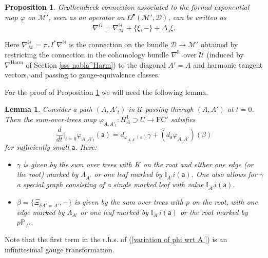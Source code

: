 \documentclass[11pt,a4paper]{amsart}
\theoremstyle{plain} %
\newtheorem{lem}[thm]{Lemma}
\newtheorem{prop}[thm]{Proposition}
\theoremstyle{definition}
\theoremstyle{remark}
\newcommand{\mr}{\mathrm}
\newcommand{\sfa}{\mathsf{a}}
\newcommand{\bt}{\bullet}
\newcommand{\ra}{\rightarrow}
\newcommand{\M}{\mathcal{M}}
\newcommand{\mc}{\mathcal}
\newcommand{\FC}{\mathrm{FC}}
\begin{document}
{\begin{prop}\label{prop formula for nabla^G}
    Grothendieck connection associated to the formal exponential map $\underline{\varphi}$ on $\M'$, seen as an operator on $\Omega^\bt(\M',\mc{D})$, can be written as
    \begin{equation}\label{nabla^G formula}
        \nabla^G=\nabla^{\mathbb{H}}_\M+\{\xi,-\}+\Delta_\sfa \xi.
    \end{equation}
\end{prop}
Here $\nabla^{\mathbb{H}}_\M=\pi_*I^* \nabla^{\mathbb{H}}$ is the connection on the bundle $\mc{D}\ra \M'$ obtained by restricting the connection in the cohomology bundle $\nabla^{\mathbb{H}}$ over $\mc{U}$ (induced by $\nabla^\mr{Harm}$ of Section \ref{sss nabla^Harm}) to the diagonal $A'=A$ and harmonic tangent vectors, and passing to gauge-equivalence classes.

For the proof of Proposition \ref{prop formula for nabla^G} we will need the following lemma.
\begin{lem}\label{lemma 5.6}
    Consider a path $(A,A'_t)$ in $\mc{U}$ passing through $(A,A')$ at $t=0$. Then the sum-over-trees map $\varphi_{A,A'_t}\colon H^1_A\supset U\ra \FC'$ satisfies
    \begin{equation}\label{variation of phi wrt A'}
        \frac{d}{dt}\Big|_{t=0}\varphi_{A,A'_t}(\sfa)=d_{\varphi_{A,A'}(\sfa)}\gamma + (d_\sfa \varphi_{A,A'})(\beta)
    \end{equation}
    for sufficiently small $\sfa$. Here:
    \begin{itemize}
        \item $\gamma$ is given by the sum over trees with $K$ on the root and either one edge (or the root) marked by $\Lambda_{\dot{A}'}$ or one leaf marked by $\mathbb{I}_{\dot{A}'}i(\sfa)$. One also allows for  $\gamma$ a special graph consisting of a single marked leaf with value $\mathbb{I}_{\dot{A}'}i(\sfa)$.
        \item $\beta=\{\Xi_{\delta A'=\dot{A}'},-\}$ is given by the sum over trees with $p$ on the root, with one edge marked by $\Lambda_{\dot{A}'}$ or one leaf marked by $\mathbb{I}_{\dot{A}'}i(\sfa)$ or the root marked by $p\mathbb{P}_{\dot{A}'}$.
    \end{itemize}
\end{lem}
Note that the first term in the r.h.s. of (\ref{variation of phi wrt A'}) is an infinitesimal gauge transformation.

}
\end{document}
